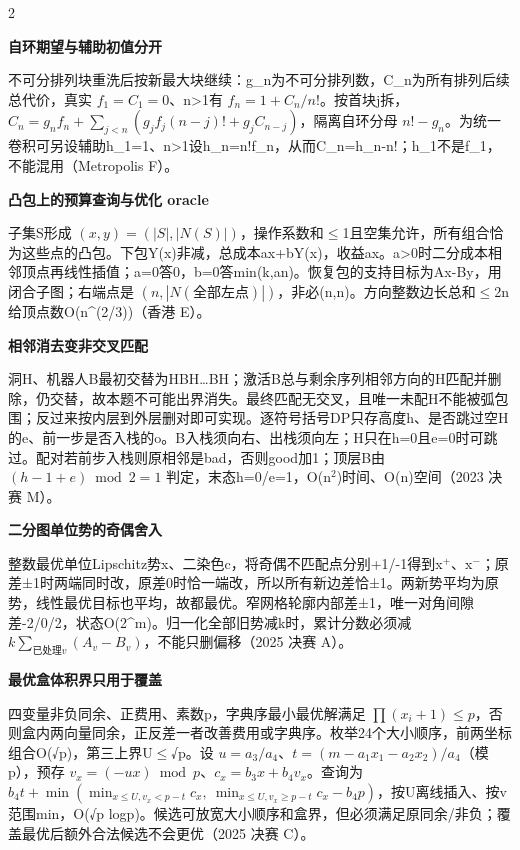 \documentclass[UTF8,fontset=fandol,a4paper,twoside]{ctexart}
\newcommand{\note}[1]{{\fontsize{10}{12}\selectfont #1\par}}
\begin{document}
\begin{multicols}{2}
\par\textbf{自环期望与辅助初值分开}\quad
\note{不可分排列块重洗后按新最大块继续：g\_n为不可分排列数，C\_n为所有排列后续总代价，真实 $f_1=C_1=0$、n>\allowbreak{}1有 $f_n=1+C_n/n!$。按首块j拆，$C_n=g_nf_n+\sum_{j<n}(g_jf_j(n-j)!+g_jC_{n-j})$，隔离自环分母 $n!-g_n$。为统一卷积可另设辅助h\_1=\allowbreak{}1、n>\allowbreak{}1设h\_n=\allowbreak{}n!f\_n，从而C\_n=\allowbreak{}h\_n-\allowbreak{}n!；h\_1不是f\_1，不能混用（Metropolis F）。}
\par\textbf{凸包上的预算查询与优化 oracle}\quad
\note{子集S形成 $(x,y)=(|S|,|N(S)|)$，操作系数和\ensuremath{\le}1且空集允许，所有组合恰为这些点的凸包。下包Y(\allowbreak{}x)\allowbreak{}非减，总成本ax+\allowbreak{}bY(\allowbreak{}x)\allowbreak{}，收益ax。a>\allowbreak{}0时二分成本相邻顶点再线性插值；a=\allowbreak{}0答0，b=\allowbreak{}0答min(\allowbreak{}k,\allowbreak{}an)\allowbreak{}。恢复包的支持目标为Ax-\allowbreak{}By，用闭合子图；右端点是 $(n,|N(\text{全部左点})|)$，非必(\allowbreak{}n,\allowbreak{}n)\allowbreak{}。方向整数边长总和\ensuremath{\le}2n给顶点数O(\allowbreak{}n\textasciicircum{}(\allowbreak{}2/\allowbreak{}3)\allowbreak{})\allowbreak{}（香港 E）。}
\par\textbf{相邻消去变非交叉匹配}\quad
\note{洞H、机器人B最初交替为HBH…BH；激活B总与剩余序列相邻方向的H匹配并删除，仍交替，故本题不可能出界消失。最终匹配无交叉，且唯一未配H不能被弧包围；反过来按内层到外层删对即可实现。逐符号括号DP只存高度h、是否跳过空H的e、前一步是否入栈的o。B入栈须向右、出栈须向左；H只在h=\allowbreak{}0且e=\allowbreak{}0时可跳过。配对若前步入栈则原相邻是bad，否则good加1；顶层B由 $(h-1+e)\bmod2=1$ 判定，末态h=\allowbreak{}0/\allowbreak{}e=\allowbreak{}1，O(\allowbreak{}n\ensuremath{^2})\allowbreak{}时间、O(\allowbreak{}n)\allowbreak{}空间（2023 决赛 M）。}
\par\textbf{二分图单位势的奇偶舍入}\quad
\note{整数最优单位Lipschitz势x、二染色c，将奇偶不匹配点分别+\allowbreak{}1/\allowbreak{}-\allowbreak{}1得到x\ensuremath{^+}、x\ensuremath{^-}；原差±1时两端同时改，原差0时恰一端改，所以所有新边差恰±1。两新势平均为原势，线性最优目标也平均，故都最优。窄网格轮廓内部差±1，唯一对角间隙差-\allowbreak{}2/\allowbreak{}0/\allowbreak{}2，状态O(\allowbreak{}2\textasciicircum{}m)\allowbreak{}。归一化全部旧势减k时，累计分数必须减 $k\sum_{\text{已处理}v}(A_v-B_v)$，不能只删偏移（2025 决赛 A）。}
\par\textbf{最优盒体积界只用于覆盖}\quad
\note{四变量非负同余、正费用、素数p，字典序最小最优解满足 $\prod(x_i+1)\le p$，否则盒内两向量同余，正反差一者改善费用或字典序。枚举24个大小顺序，前两坐标组合O(\allowbreak{}√p)\allowbreak{}，第三上界U\ensuremath{\le}√p。设 $u=a_3/a_4$、$t=(m-a_1x_1-a_2x_2)/a_4$（模p），预存 $v_x=(-ux)\bmod p$、$c_x=b_3x+b_4v_x$。查询为 $b_4t+\min(\min_{x\le U,v_x<p-t}c_x,\ \min_{x\le U,v_x\ge p-t}c_x-b_4p)$，按U离线插入、按v范围min，O(\allowbreak{}√p logp)\allowbreak{}。候选可放宽大小顺序和盒界，但必须满足原同余/\allowbreak{}非负；覆盖最优后额外合法候选不会更优（2025 决赛 C）。}

\end{multicols}
\end{document}
